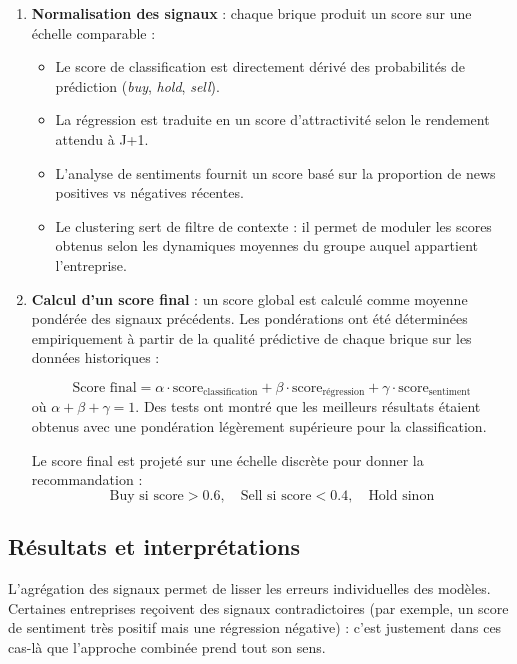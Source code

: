 \documentclass[a4paper,12pt]{article}
\begin{document}
\begin{enumerate}
  \item \textbf{Normalisation des signaux} : chaque brique produit un score sur une échelle comparable :
  \begin{itemize}
    \item Le score de classification est directement dérivé des probabilités de prédiction (\textit{buy}, \textit{hold}, \textit{sell}).
    \item La régression est traduite en un score d’attractivité selon le rendement attendu à J+1.
    \item L’analyse de sentiments fournit un score basé sur la proportion de news positives vs négatives récentes.
    \item Le clustering sert de filtre de contexte : il permet de moduler les scores obtenus selon les dynamiques moyennes du groupe auquel appartient l’entreprise.
  \end{itemize}

  \item \textbf{Calcul d’un score final} : un score global est calculé comme moyenne pondérée des signaux précédents. Les pondérations ont été déterminées empiriquement à partir de la qualité prédictive de chaque brique sur les données historiques :

  \[
  \text{Score final} = \alpha \cdot \text{score}_{\text{classification}} + \beta \cdot \text{score}_{\text{régression}} + \gamma \cdot \text{score}_{\text{sentiment}}
  \]
  où $\alpha + \beta + \gamma = 1$. Des tests ont montré que les meilleurs résultats étaient obtenus avec une pondération légèrement supérieure pour la classification.

  Le score final est projeté sur une échelle discrète pour donner la recommandation :
  \[
  \text{Buy si score} > 0.6,\quad \text{Sell si score} < 0.4,\quad \text{Hold sinon}
  \]
\end{enumerate}

\subsection*{Résultats et interprétations}

L’agrégation des signaux permet de lisser les erreurs individuelles des modèles. Certaines entreprises reçoivent des signaux contradictoires (par exemple, un score de sentiment très positif mais une régression négative) : c’est justement dans ces cas-là que l’approche combinée prend tout son sens.
\end{document}
